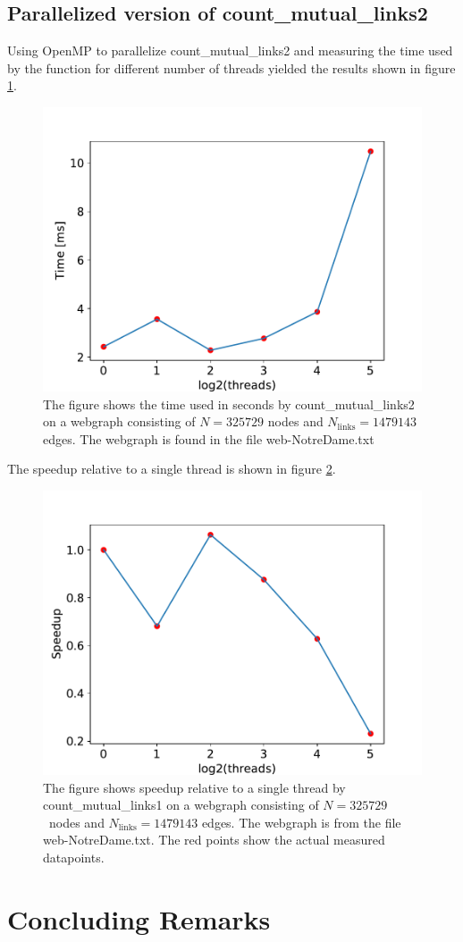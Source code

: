 \documentclass[english,notitlepage, reprint]{revtex4-1}  %
\begin{document}
\subsection*{Parallelized version of count\_mutual\_links2}
Using OpenMP to parallelize count\_mutual\_links2 and measuring the time used by the function for different number of threads yielded the results shown in figure \ref{fig:count_mutual_links2_parallel}.
\begin{figure}[H]
    \centering
    \includegraphics[scale = 0.5]{count_mutual_links2_parallel.pdf}
    \caption{The figure shows the time used  in seconds by count\_mutual\_links2 on a webgraph consisting of $N = 325729$ nodes and $N_\text{links} = 1479143$ edges. The webgraph is found in the file web-NotreDame.txt}\label{fig:count_mutual_links2_parallel}
\end{figure}
The speedup relative to a single thread is shown in figure \ref{fig:count_mutual_links2_speedup}.
\begin{figure}[H]
    \centering
    \includegraphics[scale = 0.5]{count_mutual_links2_speedup.pdf}
    \caption{The figure shows speedup relative to a single thread by count\_mutual\_links1 on a webgraph consisting of $N = 325729$ nodes and $N_\text{links} = 1479143$ edges. The webgraph is from the file web-NotreDame.txt. The red points show the actual measured datapoints.}\label{fig:count_mutual_links2_speedup}
\end{figure}

\section{Concluding Remarks}
\end{document}

